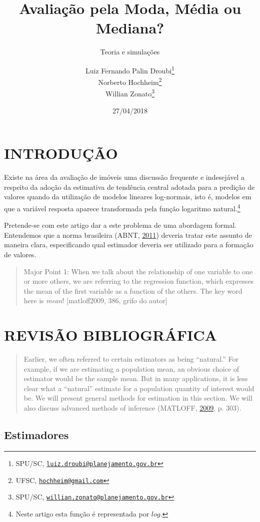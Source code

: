 \documentclass[a4paper]{article}
\title{Avaliação pela Moda, Média ou Mediana?}
\subtitle{Teoria e simulações}
\author{Luiz Fernando Palin Droubi\footnote{SPU/SC,
  \href{mailto:luiz.droubi@planejamento.gov.br}{\nolinkurl{luiz.droubi@planejamento.gov.br}}} \\ Norberto Hochheim\footnote{UFSC,
  \href{mailto:hochheim@gmail.com}{\nolinkurl{hochheim@gmail.com}}} \\ Willian Zonato\footnote{SPU/SC,
  \href{mailto:willian.zonato@planejamento.gov.br}{\nolinkurl{willian.zonato@planejamento.gov.br}}}}
\date{27/04/2018}
\let\rmarkdownfootnote\footnote%
\def\footnote{\protect\rmarkdownfootnote}
\begin{document}
\maketitle

\section{INTRODUÇÃO}\label{introducao}

Existe na área da avaliação de imóveis uma discussão frequente e
indesejável a respeito da adoção da estimativa de tendência central
adotada para a predição de valores quando da utilização de modelos
lineares log-normais, isto é, modelos em que a variável resposta aparece
transformada pela função logaritmo natural.\footnote{Neste artigo esta
  função é representada por \(log\).}

Pretende-se com este artigo dar a este problema de uma abordagem formal.
Entendemos que a norma brasileira (ABNT,
\protect\hyperlink{ref-NBR1465302}{2011}) deveria tratar este assunto de
maneira clara, especificando qual estimador deveria ser utilizado para a
formação de valores.

\begin{quote}
Major Point 1: When we talk about the relationship of one variable to
one or more others, we are referring to the regression function, which
expresses the mean of the first variable as a function of the others.
The key word here is \emph{mean}! {[}matloff2009, 386, grifo do autor{]}
\end{quote}

\section{REVISÃO BIBLIOGRÁFICA}\label{revisao-bibliografica}

\begin{quote}
Earlier, we often referred to certain estimators as being ``natural.''
For example, if we are estimating a population mean, an obvious choice
of estimator would be the sample mean. But in many applications, it is
less clear what a ``natural'' estimate for a population quantity of
interest would be. We will present general methods for estimation in
this section. We will also discuss advanced methods of inference
(MATLOFF, \protect\hyperlink{ref-matloff2009}{2009}, p. 303).
\end{quote}

\subsection{Estimadores}\label{estimadores}
\end{document}
